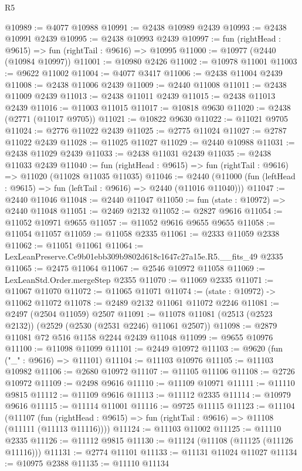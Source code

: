 \begin{lexlean}{R5}
\begin{coremodule}
@10989 := @4077 @10988
@10991 := @2438 @10989 @2439
@10993 := @2438 @10991 @2439
@10995 := @2438 @10993 @2439
@10997 := fun (rightHead : @9615) => fun (rightTail : @9616) => @10995
@11000 := @10977 (@2440 (@10984 @10997))
@11001 := @10980 @2426
@11002 := @10978 @11001
@11003 := @9622 @11002
@11004 := @4077 @3417
@11006 := @2438 @11004 @2439
@11008 := @2438 @11006 @2439
@11009 := @2440 @11008
@11011 := @2438 @11009 @2439
@11013 := @2438 @11011 @2439
@11015 := @2438 @11013 @2439
@11016 := @11003 @11015
@11017 := @10818 @9630
@11020 := @2438 (@2771 (@11017 @9705))
@11021 := @10822 @9630
@11022 := @11021 @9705
@11024 := @2776 @11022 @2439
@11025 := @2775 @11024
@11027 := @2787 @11022 @2439
@11028 := @11025 @11027
@11029 := @2440 @10988
@11031 := @2438 @11029 @2439
@11033 := @2438 @11031 @2439
@11035 := @2438 @11033 @2439
@11040 := fun (rightHead : @9615) => fun (rightTail : @9616) => @11020 (@11028 @11035 @11035)
@11046 := @2440 (@11000 (fun (leftHead : @9615) => fun (leftTail : @9616) => @2440 (@11016 @11040)))
@11047 := @2440 @11046
@11048 := @2440 @11047
@11050 := fun (state : @10972) => @2440 @11048
@11051 := @2469 @2132
@11052 := @2827 @9616
@11054 := @11052 @10971 @9655
@11057 := @11052 @9616 @9655 @9655
@11058 := @11054 @11057
@11059 := @11058 @2335
@11061 := @2333 @11059 @2338
@11062 := @11051 @11061
@11064 := LexLeanPreserve.Ce9b01ebb309b9802d618c1647c27a15e.R5.__fits_49 @2335
@11065 := @2475 @11064
@11067 := @2546 @10972 @11058
@11069 := LexLeanStd.Order.mergeStep @2355
@11070 := @11069 @2335
@11071 := @11067 @11070
@11072 := @11065 @11071
@11074 := (state : @10972) -> @11062 @11072
@11078 := @2489 @2132 @11061 @11072 @2246
@11081 := @2497 (@2504 @11059) @2507
@11091 := @11078 @11081 (@2513 (@2523 @2132)) (@2529 (@2530 (@2531 @2246) @11061 @2507))
@11098 := @2879 @11081 @72 @516 @1158 @2244 @2439 @11048
@11099 := @9655 @10976
@11100 := @11098 @11099
@11101 := @2449 @10972
@11103 := @9620 (fun ("_" : @9616) => @11101)
@11104 := @11103 @10976
@11105 := @11103 @10982
@11106 := @2680 @10972
@11107 := @11105 @11106
@11108 := @2726 @10972
@11109 := @2498 @9616
@11110 := @11109 @10971
@11111 := @11110 @9815
@11112 := @11109 @9616
@11113 := @11112 @2335
@11114 := @10979 @9616
@11115 := @11114 @11001
@11116 := @9725 @11115
@11123 := @11104
    (@11107 (fun (rightHead : @9615) => fun (rightTail : @9616) => @11108 (@11111 (@11113 @11116))))
@11124 := @11103 @11002
@11125 := @11110 @2335
@11126 := @11112 @9815
@11130 := @11124 (@11108 (@11125 (@11126 @11116)))
@11131 := @2774 @11101
@11133 := @11131 @11024 @11027
@11134 := @10975 @2388
@11135 := @11110 @11134

\end{coremodule}
\end{lexlean}
